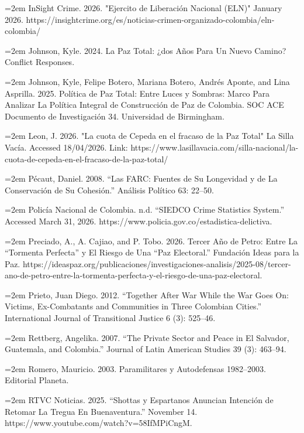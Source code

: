 \documentclass[11pt]{article}
\begin{document}
\noindent
\hangindent=2em
InSight Crime. 2026. "Ejercito de Liberación Nacional (ELN)" January 2026. https://insightcrime.org/es/noticias-crimen-organizado-colombia/eln-colombia/

\noindent
\hangindent=2em
Johnson, Kyle. 2024. La Paz Total: ¿dos Años Para Un Nuevo Camino? Conflict Responses.

\noindent
\hangindent=2em
Johnson, Kyle, Felipe Botero, Mariana Botero, Andrés Aponte, and Lina Asprilla. 2025. Política de Paz Total: Entre Luces y Sombras: Marco Para Analizar La Política Integral de Construcción de Paz de Colombia. SOC ACE Documento de Investigación 34. Universidad de Birmingham.

\noindent
\hangindent=2em
Leon, J. 2026. "La cuota de Cepeda en el fracaso de la Paz Total" La Silla Vacía. Accessed 18/04/2026. Link: https://www.lasillavacia.com/silla-nacional/la-cuota-de-cepeda-en-el-fracaso-de-la-paz-total/

\noindent
\hangindent=2em
Pécaut, Daniel. 2008. “Las FARC: Fuentes de Su Longevidad y de La Conservación de Su Cohesión.” Análisis Político 63: 22–50.

\noindent
\hangindent=2em
Policía Nacional de Colombia. n.d. “SIEDCO Crime Statistics System.” Accessed March 31, 2026. https://www.policia.gov.co/estadistica-delictiva.

\noindent
\hangindent=2em
Preciado, A., A. Cajiao, and P. Tobo. 2026. Tercer Año de Petro: Entre La “Tormenta Perfecta” y El Riesgo de Una “Paz Electoral.”
Fundación Ideas para la Paz. https://ideaspaz.org/publicaciones/investigaciones-analisis/2025-08/tercer-ano-de-petro-entre-la-tormenta-perfecta-y-el-riesgo-de-una-paz-electoral.

\noindent
\hangindent=2em
Prieto, Juan Diego. 2012. “Together After War While the War Goes On: Victims, Ex-Combatants and Communities in Three Colombian Cities.” International Journal of Transitional Justice 6 (3): 525–46.

\noindent
\hangindent=2em
Rettberg, Angelika. 2007. “The Private Sector and Peace in El Salvador, Guatemala, and Colombia.” Journal of Latin American Studies 39 (3): 463–94.

\noindent
\hangindent=2em
Romero, Mauricio. 2003. Paramilitares y Autodefensas 1982–2003. Editorial Planeta.

\noindent
\hangindent=2em
RTVC Noticias. 2025. “Shottas y Espartanos Anuncian Intención de Retomar La Tregua En Buenaventura.” November 14. https://www.youtube.com/watch?v=58IfMPiCngM.
\end{document}
